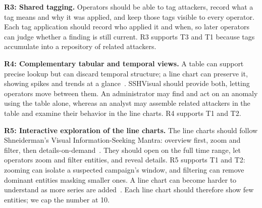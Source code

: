 \documentclass[conference]{IEEEtran}
\begin{document}
\textbf{R3: Shared tagging.} Operators should be able to tag attackers, record what a tag means and why it was applied,
and keep those tags visible to every operator. Each tag application should record who applied it and when,
so later operators can judge whether a finding is still current. R3 supports T3 and T1 because tags accumulate into a repository of related attackers.

\textbf{R4: Complementary tabular and temporal views.} A table can support precise lookup but can discard 
temporal structure; a line chart can preserve it, showing spikes and trends at a glance~\cite{few2006visual}. SSHVisual should provide both, letting operators
move between them. An administrator may find and act on an anomaly using the table alone, whereas an analyst may assemble related attackers in the table and
examine their behavior in the line charts. R4 supports T1 and T2.

\textbf{R5: Interactive exploration of the line charts.} The line charts should follow Shneiderman's Visual Information-Seeking Mantra: overview first, zoom and
filter, then details-on-demand~\cite{shneiderman1996eyes}. They should open on the full time range, let operators zoom
and filter entities, and reveal details. R5 supports T1 and T2: zooming can isolate a
suspected campaign's window, and filtering can remove dominant entities masking smaller ones. A line chart can become harder to understand
as more series are added~\cite{javed2010graphical}. Each line chart should therefore show few entities; we cap the number at 10.

\end{document}

